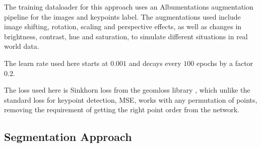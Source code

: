 \documentclass[10pt]{book}
\newcommand{\figureref}[1]{\autoref{#1}}
\begin{document}
The training dataloader for this approach uses an Albumentations augmentation pipeline for the images and keypoints label. The augmentations used include image shifting, rotation, scaling and perspective effects, as well as changes in brightness, contrast, hue and saturation, to simulate different situations in real world data.

The learn rate used here starts at $0.001$ and decays every $100$ epochs by a factor $0.2$. 


The loss used here is Sinkhorn loss from the geomloss library \cite{feydy2019interpolating}, which unlike the standard loss for keypoint detection, \ac{MSE}, works with any permutation of points, removing the requirement of getting the right point order from the network. 

\subsection{Segmentation Approach}
\end{document}
